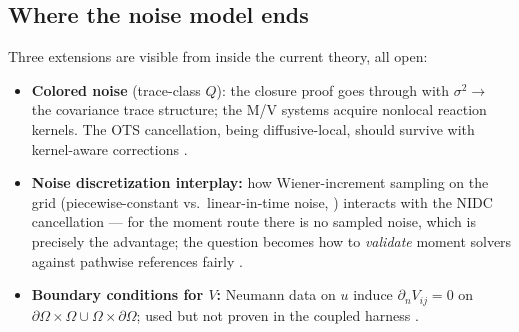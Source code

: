 \subsection{Where the noise model ends}

Three extensions are visible from inside the current theory, all open:
\begin{itemize}
\item \textbf{Colored noise} (trace-class $Q$): the closure proof goes through
with $\sigma^2 \to$ the covariance trace structure; the M/V systems acquire
nonlocal reaction kernels. The OTS cancellation, being diffusive-local, should
survive with kernel-aware corrections \tagO.
\item \textbf{Noise discretization interplay:} how Wiener-increment sampling on
the grid (piecewise-constant vs.\ linear-in-time noise,
\citep{petersson2022}) interacts with the NIDC cancellation --- for the moment
route there is no sampled noise, which is precisely the advantage; the question
becomes how to \emph{validate} moment solvers against pathwise references
fairly \tagO.
\item \textbf{Boundary conditions for $V$:} Neumann data on $u$ induce
$\partial_n V_{ij}=0$ on $\partial\Omega\times\Omega \cup \Omega\times
\partial\Omega$; used but not proven in the coupled harness \tagO.
\end{itemize}
